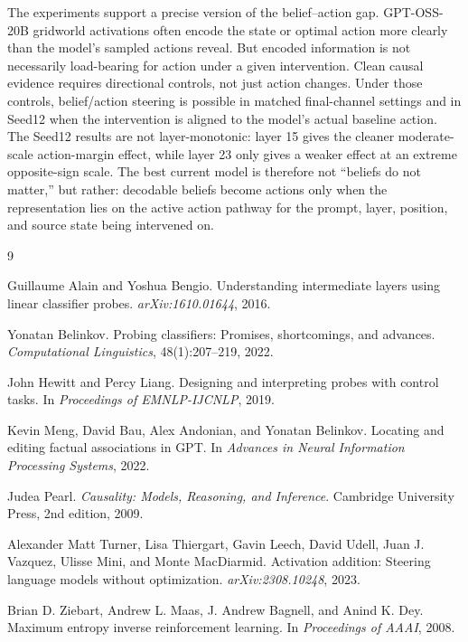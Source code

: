 \documentclass[11pt]{article}
\begin{document}
The experiments support a precise version of the belief--action gap.
GPT-OSS-20B gridworld activations often encode the state or optimal action more clearly than the model's sampled actions reveal.
But encoded information is not necessarily load-bearing for action under a given intervention.
Clean causal evidence requires directional controls, not just action changes.
Under those controls, belief/action steering is possible in matched final-channel settings and in Seed12 when the intervention is aligned to the model's actual baseline action.
The Seed12 results are not layer-monotonic: layer 15 gives the cleaner moderate-scale action-margin effect, while layer 23 only gives a weaker effect at an extreme opposite-sign scale.
The best current model is therefore not ``beliefs do not matter,'' but rather: decodable beliefs become actions only when the representation lies on the active action pathway for the prompt, layer, position, and source state being intervened on.

\begin{thebibliography}{9}

Guillaume Alain and Yoshua Bengio.
\newblock Understanding intermediate layers using linear classifier probes.
\newblock \emph{arXiv:1610.01644}, 2016.

Yonatan Belinkov.
\newblock Probing classifiers: Promises, shortcomings, and advances.
\newblock \emph{Computational Linguistics}, 48(1):207--219, 2022.

John Hewitt and Percy Liang.
\newblock Designing and interpreting probes with control tasks.
\newblock In \emph{Proceedings of EMNLP-IJCNLP}, 2019.

Kevin Meng, David Bau, Alex Andonian, and Yonatan Belinkov.
\newblock Locating and editing factual associations in GPT.
\newblock In \emph{Advances in Neural Information Processing Systems}, 2022.

Judea Pearl.
\newblock \emph{Causality: Models, Reasoning, and Inference}.
\newblock Cambridge University Press, 2nd edition, 2009.

Alexander Matt Turner, Lisa Thiergart, Gavin Leech, David Udell, Juan J. Vazquez, Ulisse Mini, and Monte MacDiarmid.
\newblock Activation addition: Steering language models without optimization.
\newblock \emph{arXiv:2308.10248}, 2023.

Brian D. Ziebart, Andrew L. Maas, J. Andrew Bagnell, and Anind K. Dey.
\newblock Maximum entropy inverse reinforcement learning.
\newblock In \emph{Proceedings of AAAI}, 2008.

\end{thebibliography}
\end{document}
